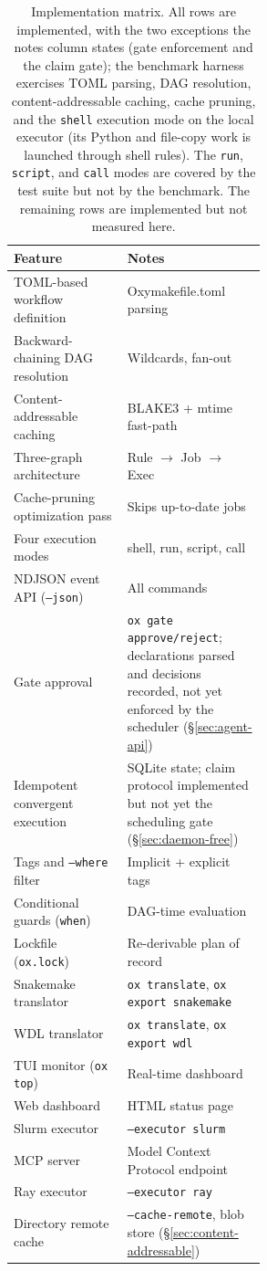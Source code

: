 \documentclass[12pt,a4paper]{article}
\newcommand{\code}[1]{{\texttt{\small\color{inlinecode}#1}}}
\begin{document}
\begin{table}[htbp]
\centering\small
\begin{tabular}{@{}lp{0.55\linewidth}@{}}
\toprule
\textbf{Feature} & \textbf{Notes} \\
\midrule
TOML-based workflow definition   & Oxymakefile.toml parsing \\
Backward-chaining DAG resolution & Wildcards, fan-out \\
Content-addressable caching      & BLAKE3 + mtime fast-path \\
Three-graph architecture         & Rule $\to$ Job $\to$ Exec \\
Cache-pruning optimization pass  & Skips up-to-date jobs \\
Four execution modes             & shell, run, script, call \\
NDJSON event API (\code{--json}) & All commands \\
Gate approval                    & \code{ox gate approve/reject}; declarations parsed and decisions recorded, not yet enforced by the scheduler (\S\ref{sec:agent-api}) \\
Idempotent convergent execution  & SQLite state; claim protocol implemented but not yet the scheduling gate (\S\ref{sec:daemon-free}) \\
Tags and \code{--where} filter & Implicit + explicit tags \\
Conditional guards (\code{when}) & DAG-time evaluation \\
Lockfile (\code{ox.lock})      & Re-derivable plan of record \\
Snakemake translator             & \code{ox translate}, \code{ox export snakemake} \\
WDL translator                   & \code{ox translate}, \code{ox export wdl} \\
TUI monitor (\code{ox top})    & Real-time dashboard \\
Web dashboard                    & HTML status page \\
Slurm executor                   & \code{--executor slurm} \\
MCP server                       & Model Context Protocol endpoint \\
Ray executor                     & \code{--executor ray} \\
Directory remote cache           & \code{--cache-remote}, blob store (\S\ref{sec:content-addressable}) \\
\bottomrule
\end{tabular}
\caption{Implementation matrix. All rows are implemented, with the two exceptions the notes column states (gate enforcement and the claim gate); the benchmark
  harness exercises TOML parsing, DAG resolution, content-addressable
  caching, cache pruning, and the \code{shell} execution mode on the
  local executor (its Python and file-copy work is launched through
  shell rules). The \code{run}, \code{script}, and \code{call} modes
  are covered by the test suite but not by the benchmark. The remaining
  rows are implemented but not measured here.}
\label{tab:features}
\end{table}
\end{document}
